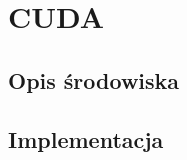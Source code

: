 \chapter{CUDA}
\label{cha:cuda}

\section{Opis środowiska}
\label{sec:opis_cuda}

\section{Implementacja}
\label{sec:implementacja}